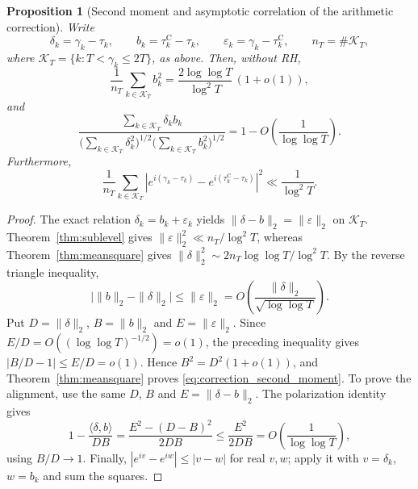 \documentclass[11pt,a4paper]{article}
\makeatletter
\numberwithin{equation}{section}
\DeclareRobustCommand{\CGref}[1]{\ref{#1}}
\DeclareRobustCommand{\CGeqref}[1]{\eqref{#1}}
\let\CG@origref\ref
\let\CG@origeqref\eqref
\newcommand{\CG@gettip}[1]{\@ifundefined{CGTip@#1}{#1}{\csname CGTip@#1\endcsname}}
\DeclareRobustCommand{\CGref}[1]{\pdftooltip{\CG@origref{#1}}{\CG@gettip{#1}}}
\DeclareRobustCommand{\CGeqref}[1]{\pdftooltip{\CG@origeqref{#1}}{\CG@gettip{#1}}}
\newtheorem{proposition}[theorem]{Proposition}
\theoremstyle{definition}
\theoremstyle{remark}
\makeatother
\begin{document}
\begin{proposition}[Second moment and asymptotic correlation of the arithmetic correction]\label{prop:correction_second_moment}
Write
\begin{equation}
\delta_k=\gamma_k-\tau_k,\qquad
b_k=\tau_k^{\mathrm C}-\tau_k,\qquad
\varepsilon_k=\gamma_k-\tau_k^{\mathrm C},\qquad
n_T=\#\mathcal K_T,
\label{eq:disp_37}
\end{equation}
where $\mathcal K_T=\{k:T<\gamma_k\le2T\}$, as above. Then, without RH,
\begin{equation}
\frac1{n_T}\sum_{k\in\mathcal K_T}b_k^2
=\frac{2\log\log T}{\log^2T}\,(1+o(1)),
\label{eq:correction_second_moment}
\end{equation}
and
\begin{equation}
\frac{\sum_{k\in\mathcal K_T}\delta_kb_k}
{\bigl(\sum_{k\in\mathcal K_T}\delta_k^2\bigr)^{1/2}
 \bigl(\sum_{k\in\mathcal K_T}b_k^2\bigr)^{1/2}}
=1-O\!\left(\frac1{\log\log T}\right).
\label{eq:correction_alignment}
\end{equation}
Furthermore,
\begin{equation}
\frac1{n_T}\sum_{k\in\mathcal K_T}
\left|e^{i(\gamma_k-\tau_k)}-e^{i(\tau_k^{\mathrm C}-\tau_k)}\right|^2
\ll\frac1{\log^2T}.
\label{eq:correction_phases}
\end{equation}
\end{proposition}
\begin{proof}
The exact relation $\delta_k=b_k+\varepsilon_k$ yields
$\|\delta-b\|_2=\|\varepsilon\|_2$ on $\mathcal K_T$.
Theorem~\CGref{thm:sublevel} gives
$\|\varepsilon\|_2^2\ll n_T/\log^2T$, whereas
Theorem~\CGref{thm:meansquare} gives
$\|\delta\|_2^2\sim2n_T\log\log T/\log^2T$.
By the reverse triangle inequality,
\begin{equation}
\bigl|\|b\|_2-\|\delta\|_2\bigr|
\le\|\varepsilon\|_2
=O\!\left(\frac{\|\delta\|_2}{\sqrt{\log\log T}}\right).
\label{eq:disp_38}
\end{equation}
Put $D=\|\delta\|_2$, $B=\|b\|_2$ and $E=\|\varepsilon\|_2$. Since $E/D=O((\log\log T)^{-1/2})=o(1)$, the preceding inequality gives $|B/D-1|\le E/D=o(1)$. Hence $B^2=D^2(1+o(1))$, and Theorem~\CGref{thm:meansquare} proves \CGeqref{eq:correction_second_moment}.
To prove the alignment, use the same $D$, $B$ and $E=\|\delta-b\|_2$.
The polarization identity gives
\begin{equation}
1-\frac{\langle\delta,b\rangle}{DB}
=\frac{E^2-(D-B)^2}{2DB}
\le\frac{E^2}{2DB}
=O\!\left(\frac1{\log\log T}\right),
\label{eq:disp_39}
\end{equation}
using $B/D\to1$.
Finally, $|e^{iv}-e^{iw}|\le|v-w|$ for real $v,w$; apply it with
$v=\delta_k$, $w=b_k$ and sum the squares.
\end{proof}
\end{document}
